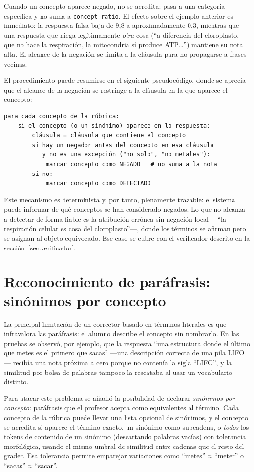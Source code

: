 Cuando un concepto aparece negado, no se acredita: pasa a una categoría específica y no suma a \texttt{concept\_ratio}. El efecto sobre el ejemplo anterior es inmediato: la respuesta falsa baja de 9{,}8 a aproximadamente 0{,}3, mientras que una respuesta que niega legítimamente \emph{otra} cosa (``a diferencia del cloroplasto, que no hace la respiración, la mitocondria sí produce ATP\dots'') mantiene su nota alta. El alcance de la negación se limita a la cláusula para no propagarse a frases vecinas.

El procedimiento puede resumirse en el siguiente pseudocódigo, donde se aprecia que el alcance de la negación se restringe a la cláusula en la que aparece el concepto:

\begin{lstlisting}[style=pycode]
para cada concepto de la rúbrica:
    si el concepto (o un sinónimo) aparece en la respuesta:
        cláusula = cláusula que contiene el concepto
        si hay un negador antes del concepto en esa cláusula
           y no es una excepción ("no solo", "no metales"):
            marcar concepto como NEGADO   # no suma a la nota
        si no:
            marcar concepto como DETECTADO
\end{lstlisting}

Este mecanismo es determinista y, por tanto, plenamente trazable: el sistema puede informar de qué conceptos se han considerado negados. Lo que no alcanza a detectar de forma fiable es la atribución errónea sin negación local —``la respiración celular es cosa del cloroplasto''—, donde los términos se afirman pero se asignan al objeto equivocado. Ese caso se cubre con el verificador descrito en la sección~\ref{sec:verificador}.

\section{Reconocimiento de paráfrasis: sinónimos por concepto}
\label{sec:sinonimos}

La principal limitación de un corrector basado en términos literales es que infravalora las paráfrasis: el alumno describe el concepto sin nombrarlo. En las pruebas se observó, por ejemplo, que la respuesta ``una estructura donde el último que metes es el primero que sacas'' —una descripción correcta de una pila LIFO— recibía una nota próxima a cero porque no contenía la sigla ``LIFO'', y la similitud por bolsa de palabras tampoco la rescataba al usar un vocabulario distinto.

Para atacar este problema se añadió la posibilidad de declarar \emph{sinónimos por concepto}: paráfrasis que el profesor acepta como equivalentes al término. Cada concepto de la rúbrica puede llevar una lista opcional de sinónimos, y el concepto se acredita si aparece el término exacto, un sinónimo como subcadena, o \emph{todos} los tokens de contenido de un sinónimo (descartando palabras vacías) con tolerancia morfológica, usando el mismo umbral de similitud entre cadenas que el resto del grader. Esa tolerancia permite emparejar variaciones como ``metes''$\approx$``meter'' o ``sacas''$\approx$``sacar''.


